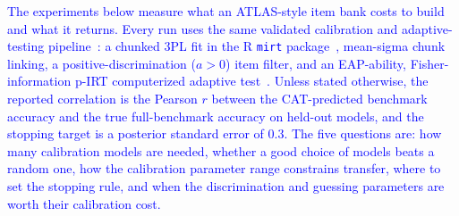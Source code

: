 %
%

\providecommand{\aiadd}[1]{\textcolor{blue}{#1}}
\providecommand{\aibullets}[1]{{\color{blue}#1}}

\aiadd{The experiments below measure what an ATLAS-style item bank costs to
build and what it returns. Every run uses the same validated calibration and
adaptive-testing pipeline~\cite{li2025atlas}: a chunked 3PL fit in the R
\texttt{mirt} package~\cite{chalmers2012mirt}, mean-sigma chunk linking, a
positive-discrimination ($a>0$) item filter, and an EAP-ability, Fisher-information
p-IRT computerized adaptive test~\cite{lord1980irt,wainer2000cat}. Unless stated
otherwise, the reported correlation is the Pearson $r$ between the CAT-predicted
benchmark accuracy and the true full-benchmark accuracy on held-out models, and
the stopping target is a posterior standard error of $0.3$. The five questions
are: how many calibration models are needed, whether a good choice of models
beats a random one, how the calibration parameter range constrains transfer,
where to set the stopping rule, and when the discrimination and guessing
parameters are worth their calibration cost.}

